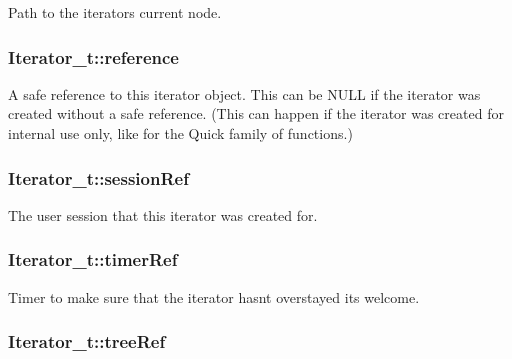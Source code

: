 Path to the iterator\textquotesingle{}s current node. 

\subsubsection[{\texorpdfstring{reference}{reference}}]{ Iterator\+\_\+t\+::reference}\hypertarget{struct_iterator__t_aa3ddd0c1f4109a9a57d5723555554782}{}\label{struct_iterator__t_aa3ddd0c1f4109a9a57d5723555554782}
A safe reference to this iterator object. This can be N\+U\+LL if the iterator was created without a safe reference. (This can happen if the iterator was created for internal use only, like for the Quick family of functions.) 
\subsubsection[{\texorpdfstring{session\+Ref}{sessionRef}}]{ Iterator\+\_\+t\+::session\+Ref}\hypertarget{struct_iterator__t_a69f75e545f293eb4cba0ad42a7a8b00f}{}\label{struct_iterator__t_a69f75e545f293eb4cba0ad42a7a8b00f}


The user session that this iterator was created for. 

\subsubsection[{\texorpdfstring{timer\+Ref}{timerRef}}]{ Iterator\+\_\+t\+::timer\+Ref}\hypertarget{struct_iterator__t_a08481e2c867b158b42083d83647dbcd8}{}\label{struct_iterator__t_a08481e2c867b158b42083d83647dbcd8}
Timer to make sure that the iterator hasn\textquotesingle{}t overstayed it\textquotesingle{}s welcome. 
\subsubsection[{\texorpdfstring{tree\+Ref}{treeRef}}]{ Iterator\+\_\+t\+::tree\+Ref}\hypertarget{struct_iterator__t_ae0c06bda7f98273df1c8cf652c85335d}{}\label{struct_iterator__t_ae0c06bda7f98273df1c8cf652c85335d}


